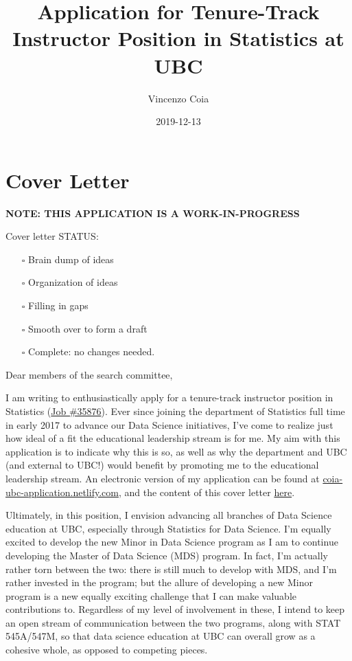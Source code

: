 \documentclass[]{article}
\title{Application for Tenure-Track Instructor Position in Statistics at UBC}
\author{Vincenzo Coia}
\date{2019-12-13}
\providecommand{\tightlist}{%
  \setlength{\itemsep}{0pt}\setlength{\parskip}{0pt}}
\begin{document}
\maketitle

{
\hypersetup{linkcolor=black}
\setcounter{tocdepth}{2}
\tableofcontents
}
\hypertarget{cover-letter}{%
\section{Cover Letter}\label{cover-letter}}

\textbf{NOTE: THIS APPLICATION IS A WORK-IN-PROGRESS}

Cover letter STATUS:

\begin{itemize}
\tightlist
\item[$\square$]
  Brain dump of ideas
\item[$\square$]
  Organization of ideas
\item[$\square$]
  Filling in gaps
\item[$\square$]
  Smooth over to form a draft
\item[$\square$]
  Complete: no changes needed.
\end{itemize}

Dear members of the search committee,

I am writing to enthusiastically apply for a tenure-track instructor position in Statistics (\href{https://www.stat.ubc.ca/three-tenure-track-instructor-positions-statistics-35876}{Job \#35876}). Ever since joining the department of Statistics full time in early 2017 to advance our Data Science initiatives, I've come to realize just how ideal of a fit the educational leadership stream is for me. My aim with this application is to indicate why this is so, as well as why the department and UBC (and external to UBC!) would benefit by promoting me to the educational leadership stream. An electronic version of my application can be found at \href{https://coia-ubc-application.netlify.com/}{coia-ubc-application.netlify.com}, and the content of this cover letter \href{}{here}.

Ultimately, in this position, I envision advancing all branches of Data Science education at UBC, especially through Statistics for Data Science. I'm equally excited to develop the new Minor in Data Science program as I am to continue developing the Master of Data Science (MDS) program. In fact, I'm actually rather torn between the two: there is still much to develop with MDS, and I'm rather invested in the program; but the allure of developing a new Minor program is a new equally exciting challenge that I can make valuable contributions to. Regardless of my level of involvement in these, I intend to keep an open stream of communication between the two programs, along with STAT 545A/547M, so that data science education at UBC can overall grow as a cohesive whole, as opposed to competing pieces.
\end{document}
